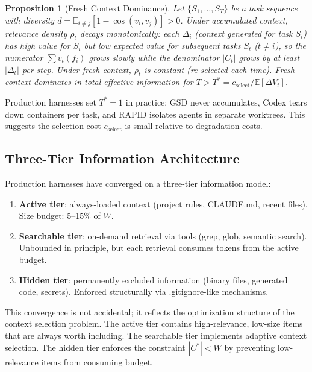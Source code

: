 \documentclass[11pt, a4paper]{googledeepmind}
\newtheorem{proposition}{Proposition}[section]
\begin{document}
\begin{proposition}[Fresh Context Dominance]
\label{prop:fresh-context}
Let $\{S_1, \ldots, S_T\}$ be a task sequence with diversity $d = \mathbb{E}_{i \neq j}[1 - \cos(v_i, v_j)] > 0$. Under accumulated context, relevance density $\rho_t$ decays monotonically: each $\Delta_i$ (context generated for task $S_i$) has high value for $S_i$ but low expected value for subsequent tasks $S_t$ ($t \neq i$), so the numerator $\sum v_t(f_i)$ grows slowly while the denominator $|C_t|$ grows by at least $|\Delta_t|$ per step. Under fresh context, $\rho_t$ is constant (re-selected each time). Fresh context dominates in total effective information for $T > T^* = c_{\text{select}} / \mathbb{E}[\Delta V_t]$.
\end{proposition}

Production harnesses set $T^* = 1$ in practice: GSD never accumulates, Codex tears down containers per task, and RAPID isolates agents in separate worktrees. This suggests the selection cost $c_{\text{select}}$ is small relative to degradation costs.

\subsection{Three-Tier Information Architecture}

Production harnesses have converged on a three-tier information model:

\begin{enumerate}
    \item \textbf{Active tier}: always-loaded context (project rules, CLAUDE.md, recent files). Size budget: 5--15\% of $W$.
    \item \textbf{Searchable tier}: on-demand retrieval via tools (grep, glob, semantic search). Unbounded in principle, but each retrieval consumes tokens from the active budget.
    \item \textbf{Hidden tier}: permanently excluded information (binary files, generated code, secrets). Enforced structurally via .gitignore-like mechanisms.
\end{enumerate}

This convergence is not accidental; it reflects the optimization structure of the context selection problem. The active tier contains high-relevance, low-size items that are always worth including. The searchable tier implements adaptive context selection. The hidden tier enforces the constraint $|C^*| < W$ by preventing low-relevance items from consuming budget.
\end{document}

